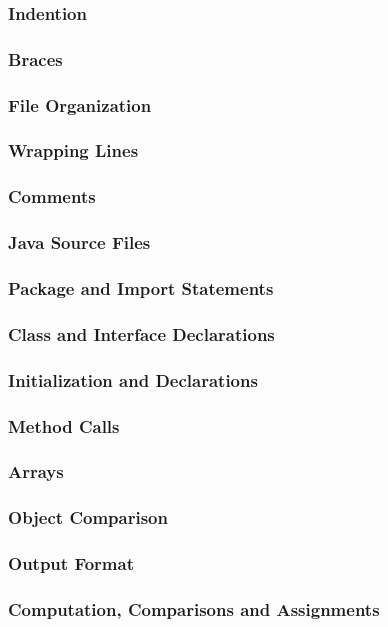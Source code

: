 \documentclass{article}
\begin{document}
\subsubsection{Indention}
\subsubsection{Braces}
\subsubsection{File Organization}
\subsubsection{Wrapping Lines}
\subsubsection{Comments}
\subsubsection{Java Source Files}
\subsubsection{Package and Import Statements}
\subsubsection{Class and Interface Declarations}
\subsubsection{Initialization and Declarations}
\subsubsection{Method Calls}
\subsubsection{Arrays}
\subsubsection{Object Comparison}
\subsubsection{Output Format}
\subsubsection{Computation, Comparisons and Assignments}
\end{document}
